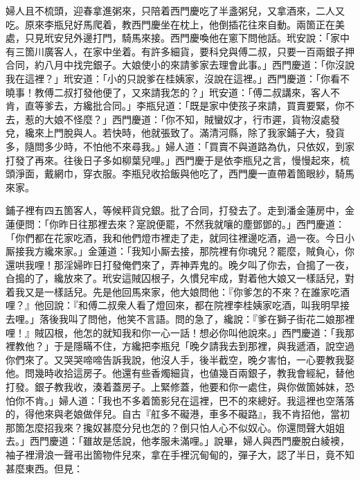 婦人且不梳頭，迎春拿進粥來，只陪着西門慶吃了半盞粥兒，又拿酒來，二人又吃。原來李瓶兒好馬爬着，教西門慶坐在枕上，他倒插花往來自動。兩箇正在美處，只見玳安兒外邊打門，騎馬來接。西門慶喚他在窻下問他話。玳安說：「家中有三箇川廣客人，在家中坐着。有許多細貨，要科兌與傅二叔，只要一百兩銀子押合同，約八月中找完銀子。大娘使小的來請爹家去理會此事。」{}西門慶道：「你沒說我在這裡？」玳安道：「小的只說爹在桂姨家，沒說在這裡。」西門慶道：「你看不曉事！教傅二叔打發他便了，又來請我怎的？」玳安道：「傅二叔講來，客人不肯，直等爹去，方纔批合同。」李瓶兒道：「既是家中使孩子來請，買賣要緊，你不去，惹的大娘不怪麼？」西門慶道：「你不知，賊蠻奴才，行市遲，貨物沒處發兌，纔來上門脫與人。{}若快時，他就張致了。滿清河縣，除了我家鋪子大，發貨多，隨問多少時，不怕他不來尋我。」{}婦人道：「買賣不與道路為仇，{}只依奴，到家打發了再來。往後日子多如柳葉兒哩。」西門慶于是依李瓶兒之言，慢慢起來，梳頭淨面，戴網巾，穿衣服。李瓶兒收拾飯與他吃了，西門慶一直帶着箇眼紗，騎馬來家。

鋪子裡有四五箇客人，等候秤貨兌銀。批了合同，打發去了。走到潘金蓮房中，金蓮便問：「你昨日往那裡去來？寔說便罷，不然我就嚷的塵鄧鄧的。」西門慶道：「你們都在花家吃酒，我和他們燈市裡走了走，就同往裡邊吃酒，過一夜。今日小厮接我方纔來家。」金蓮道：「我知小厮去接，那院裡有你魂兒？罷麼，賊負心，你還哄我哩！那淫婦昨日打發俺們來了，弄神弄鬼的。晚夕叫了你去，㒲搗了一夜，㒲搗的了，纔放來了。{}玳安這賊囚根子，久慣兒牢成，對着他大娘又一樣話兒，對着我又是一樣話兒。先是他回馬來家，他大娘問他：『你爹怎的不來？在誰家吃酒哩？』他回說：『和傅二叔衆人看了燈回來，都在院裡李桂姨家吃酒，叫我明早接去哩。」落後我叫了問他，他笑不言語。問的急了，{}纔說：『爹在獅子街花二娘那裡哩！』賊囚根，他怎的就知我和你一心一話！想必你叫他說來。」西門慶道：「我那裡教他？」于是隱瞞不住，方纔把李瓶兒「晚夕請我去到那裡，與我遞酒，說空過你們來了。又哭哭啼啼告訴我說，他沒人手，後半截空，晚夕害怕，一心要教我娶他。問幾時收拾這房子。他還有些香燭細貨，也値幾百兩銀子，教我會經紀，替他打發。銀子教我收，湊着蓋房子。上緊修蓋，他要和你一處住，與你做箇姊妹，恐怕你不肯。」{}婦人道：「我也不多着箇影兒在這裡，巴不的來總好。我這裡也空落落的，得他來與老娘做伴兒。自古『舡多不礙港，車多不礙路』，我不肯招他，當初那箇怎麼招我來？攙奴甚麼分兒也怎的？倒只怕人心不似奴心。{}{}你還問聲大姐姐去。」西門慶道：「雖故是恁說，他孝服未滿哩。」說畢，婦人與西門慶脫白綾襖，袖子裡滑浪一聲弔出箇物件兒來，{}拿在手裡沉甸甸的，彈子大，認了半日，竟不知甚麼東西。但見：

